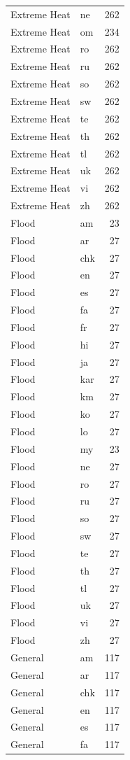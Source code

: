 \begin{longtable}{p{3cm} p{3cm} r}
Extreme Heat & ne & 262 \\
Extreme Heat & om & 234 \\
Extreme Heat & ro & 262 \\
Extreme Heat & ru & 262 \\
Extreme Heat & so & 262 \\
Extreme Heat & sw & 262 \\
Extreme Heat & te & 262 \\
Extreme Heat & th & 262 \\
Extreme Heat & tl & 262 \\
Extreme Heat & uk & 262 \\
Extreme Heat & vi & 262 \\
Extreme Heat & zh & 262 \\
Flood & am & 23 \\
Flood & ar & 27 \\
Flood & chk & 27 \\
Flood & en & 27 \\
Flood & es & 27 \\
Flood & fa & 27 \\
Flood & fr & 27 \\
Flood & hi & 27 \\
Flood & ja & 27 \\
Flood & kar & 27 \\
Flood & km & 27 \\
Flood & ko & 27 \\
Flood & lo & 27 \\
Flood & my & 23 \\
Flood & ne & 27 \\
Flood & ro & 27 \\
Flood & ru & 27 \\
Flood & so & 27 \\
Flood & sw & 27 \\
Flood & te & 27 \\
Flood & th & 27 \\
Flood & tl & 27 \\
Flood & uk & 27 \\
Flood & vi & 27 \\
Flood & zh & 27 \\
General & am & 117 \\
General & ar & 117 \\
General & chk & 117 \\
General & en & 117 \\
General & es & 117 \\
General & fa & 117 \\

\end{longtable}
